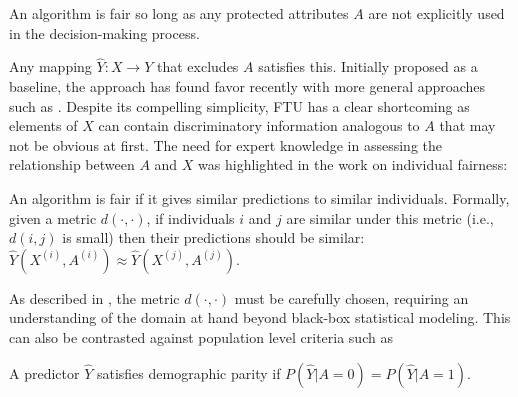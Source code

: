 \begin{define}
  An algorithm is fair so long as any protected attributes $A$ are not
  explicitly used in the decision-making process. 
\end{define}
Any mapping $\hat{Y}: X \rightarrow Y$ that excludes $A$ satisfies
this. Initially proposed as a baseline, the approach has found
favor recently with more general approaches such as \citet{grgiccase}.
Despite its compelling simplicity, FTU has a clear
shortcoming as elements of $X$ can contain discriminatory information
analogous to $A$ that may not be obvious at first. The need for expert
knowledge in assessing the relationship between $A$ and $X$ was
highlighted in the work on individual fairness:
%
\begin{define}
  An algorithm is fair if it gives similar predictions to similar
  individuals. Formally, given a metric $d(\cdot,\cdot)$, if individuals $i$ and $j$ are similar under this metric (i.e., $d(i,j)$ is small) then their predictions should be similar: $\hat{Y}(X^{(i)}, A^{(i)}) \approx \hat{Y}(X^{(j)}, A^{(j)})$.
\end{define}
As described in \cite{dwork2012fairness}, the metric $d(\cdot,\cdot)$ must be carefully chosen, requiring an understanding of the domain at
hand beyond black-box statistical modeling. This can also be
contrasted against population level criteria such as
%
\begin{define} 
A predictor  $\hat{Y}$ satisfies demographic parity if
$P(\hat{Y} | A = 0) = P(\hat{Y} | A = 1)$. %
\end{define}
